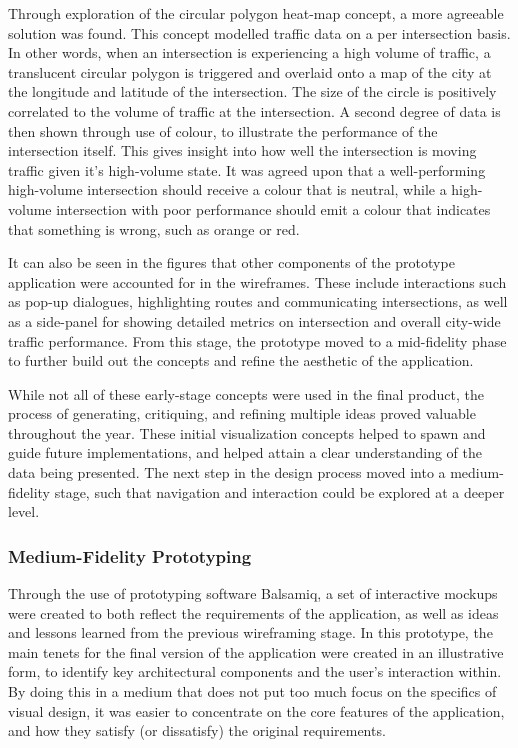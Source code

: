 \documentclass{report}
\begin{document}
Through exploration of the circular polygon heat-map concept, a more agreeable solution was found.
This concept modelled traffic data on a per intersection basis.
In other words, when an intersection is experiencing a high volume of traffic, a translucent circular polygon is triggered and overlaid onto a map of the city at the longitude and latitude of the intersection.
The size of the circle is positively correlated to the volume of traffic at the intersection.
A second degree of data is then shown through use of colour, to illustrate the performance of the intersection itself.
This gives insight into how well the intersection is moving traffic given it's high-volume state.
It was agreed upon that a well-performing high-volume intersection should receive a colour that is neutral, while a high-volume intersection with poor performance should emit a colour that indicates that something is wrong, such as orange or red.

It can also be seen in the figures that other components of the prototype application were accounted for in the wireframes.
These include interactions such as pop-up dialogues, highlighting routes and communicating intersections, as well as a side-panel for showing detailed metrics on intersection and overall city-wide traffic performance.
From this stage, the prototype moved to a mid-fidelity phase to further build out the concepts and refine the aesthetic of the application.

While not all of these early-stage concepts were used in the final product, the process of generating, critiquing, and refining multiple ideas proved valuable throughout the year.
These initial visualization concepts helped to spawn and guide future implementations, and helped attain a clear understanding of the data being presented.
The next step in the design process moved into a medium-fidelity stage, such that navigation and interaction could be explored at a deeper level.

\subsubsection{Medium-Fidelity Prototyping}
Through the use of prototyping software Balsamiq, a set of interactive mockups were created to both reflect the requirements of the application, as well as ideas and lessons learned from the previous wireframing stage.
In this prototype, the main tenets for the final version of the application were created in an illustrative form, to identify key architectural components and the user's interaction within.
By doing this in a medium that does not put too much focus on the specifics of visual design, it was easier to concentrate on the core features of the application, and how they satisfy (or dissatisfy) the original requirements. 
\end{document}
